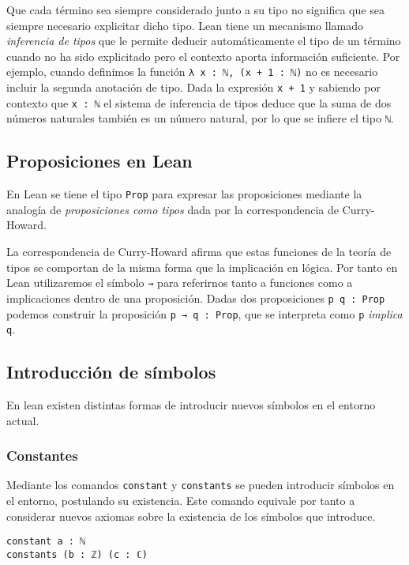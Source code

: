 
Que cada término sea siempre considerado junto a su tipo no significa que sea
siempre necesario explicitar dicho tipo. Lean tiene un mecanismo llamado
\textit{inferencia de tipos} que le permite deducir automáticamente el tipo de
un término cuando no ha sido explicitado pero el contexto aporta información
suficiente.
Por ejemplo, cuando definimos la función \lstinline{λ x : ℕ, (x + 1 : ℕ)} no es
necesario incluir la segunda anotación de tipo. Dada la expresión
\lstinline{x + 1} y sabiendo por contexto que \lstinline{x : ℕ} el sistema de
inferencia de tipos deduce que la suma de dos números naturales también es un
número natural, por lo que se infiere el tipo \lstinline{ℕ}.

\subsection{Proposiciones en Lean}

En Lean se tiene el tipo \lstinline{Prop} para expresar las proposiciones
mediante la analogía de \textit{proposiciones como tipos} dada por la
correspondencia de Curry-Howard.

La correspondencia de Curry-Howard afirma que estas funciones de la
teoría de tipos se comportan de la misma forma que la implicación en lógica. Por
tanto en Lean utilizaremos el símbolo \lstinline{→} para referirnos tanto a
funciones como a implicaciones dentro de una proposición. Dadas dos
proposiciones \lstinline{p q : Prop} podemos construir la proposición
\lstinline{p → q : Prop}, que se interpreta como \lstinline{p} \textit{implica}
\lstinline{q}.

\subsection{Introducción de símbolos}

En lean existen distintas formas de introducir nuevos símbolos en el entorno
actual.

\subsubsection{Constantes}%

Mediante los comandos \lstinline{constant} y \lstinline{constants} se
pueden introducir símbolos en el entorno, postulando su existencia. Este comando
equivale por tanto a considerar nuevos axiomas sobre la existencia de los
símbolos que introduce.
\begin{lstlisting}
constant a : ℕ
constants (b : ℤ) (c : ℂ)
\end{lstlisting}


